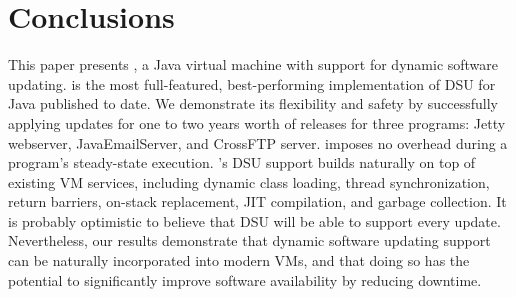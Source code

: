 \section{Conclusions}
\label{sec:conc}

This paper presents \DSU, a Java virtual machine with support for
dynamic software updating.  \DSU{} is the most full-featured,
best-performing implementation of DSU for Java published to date.  We
demonstrate its flexibility and safety by successfully applying updates
for one to two years worth of releases for three programs: Jetty
webserver, JavaEmailServer, and CrossFTP server.  \DSU{} imposes no
overhead during a program's steady-state  execution.  
\DSU's DSU support builds naturally
on top of existing VM services, including dynamic class loading,
thread synchronization, return barriers, on-stack replacement, JIT compilation, and
garbage collection.  It is probably optimistic to believe that DSU
will be able to support every update.  Nevertheless, our results
demonstrate that dynamic software updating support can be naturally
incorporated into modern VMs, and that doing so has the potential to
significantly improve software availability by reducing downtime.
